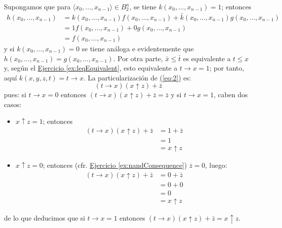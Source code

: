   \begin{solution}
    Supongamos que para
    $\langle x_{0},\ldots,x_{n-1}\rangle\in B_{2}^{n}$, se tiene
    $k(x_{0},\ldots,x_{n-1})=1$; entonces
    \begin{align*}
      h(x_{0},\ldots,x_{n-1})&=k(x_{0},\ldots,x_{n-1})f(x_{0},\ldots,x_{n-1})
                            +\bar{k}(x_{0},\ldots,x_{n-1})g(x_{0},\ldots,x_{n-1})\\
                           &=1f(x_{0},\ldots,x_{n-1})
                            +0g(x_{0},\ldots,x_{n-1})\\
                           &=f(x_{0},\ldots,x_{n-1})
    \end{align*}
    y si $k(x_{0},\ldots,x_{n-1})=0$ se tiene análoga e evidentemente
    que $h(x_{0},\ldots,x_{n-1})=g(x_{0},\ldots,x_{n-1})$. Por otra
    parte, $\bar{x}\leq\bar{t}$ es equivalente a $t\leq x$ y, según el
    \hyperref[ex:leqEquivalent]{Ejercicio \ref*{ex:leqEquivalent}},
    esto equivalente a $t\to x=1$; por tanto, aquí
    $k(x,y,z,t)=t\to x$. La particularización de
    \hyperref[eq:2]{(\ref*{eq:2})} es:
    \begin{equation*}
      (t\to x)(x\uparrow z)+\bar{z}
    \end{equation*}
    pues: si $t\to x=0$ entonces
    $(t\to x)(x\uparrow z)+\bar{z}=\bar{z}$ y si $t\to x=1$, caben dos
    casos:
    \begin{itemize}
    \item $x\uparrow z=1$; entonces 
      \begin{align*}
        (t\to x)(x\uparrow z)+\bar{z}&=1+\bar{z}\\
                       &=1\\
                       &=x\uparrow z
      \end{align*}
    \item $x\uparrow z=0$; entonces
      (cfr. \hyperref[ex:nandConsequence]{Ejercicio
        \ref*{ex:nandConsequence}}) $\bar{z}=0$, luego:
      \begin{align*}
        (t\to x)(x\uparrow z)+\bar{z}&=0+\bar{z}\\
                       &=0+0\\
                       &=0\\
                       &=x\uparrow z
      \end{align*}
    \end{itemize}
    de lo que deducimos que si $t\to x=1$ entonces
    $(t\to x)(x\uparrow z)+\bar{z}=x\uparrow z$.
  \end{solution}

